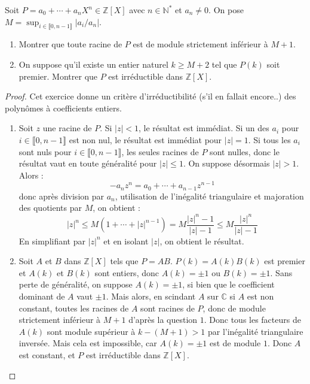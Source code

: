 \documentclass[french,a4paper]{article}
\newcommand{\N}{\mathbb{N}}
\newcommand{\Z}{\mathbb{Z}}
\newcommand{\C}{\mathbb{C}}
\newcommand{\st}{^*}
\theoremstyle{plain}
\theoremstyle{definition}
\theoremstyle{remark}
\begin{document}
\begin{ex}{}
	Soit $P=a_0+\cdots+a_nX^n\in\Z[X]$ avec $n\in\N\st$ et $a_n\ne 0$. On pose $M=\displaystyle\sup_{i\in\llbracket0,n-1\rrbracket}\lvert a_i/a_{n}\rvert$.
	\begin{enumerate}
		\item Montrer que toute racine de $P$ est de module strictement inférieur à $M+1$.
		\item On suppose qu'il existe un entier naturel $k\geqslant M+2$ tel que $P(k)$ soit premier. Montrer que $P$ est irréductible dans $\Z[X]$.
	\end{enumerate}
\end{ex}
\begin{proof}
	Cet exercice donne un critère d'irréductibilité (s'il en fallait encore..) des polynômes à coefficients entiers.
	\begin{enumerate}
		\item Soit $z$ une racine de $P$. Si $\lvert z\rvert<1$, le résultat est immédiat. Si un des $a_i$ pour $i\in\llbracket0,n-1\rrbracket$ est non nul, le résultat est immédiat pour $\lvert z\rvert=1$. Si tous les $a_i$ sont nuls pour $i\in\llbracket0,n-1\rrbracket$, les seules racines de $P$ sont nulles, donc le résultat vaut en toute généralité pour $\lvert z\rvert\leqslant 1$. On suppose désormais $\lvert z\rvert >1$. Alors : $$-a_nz^n=a_0+\cdots+a_{n-1}z^{n-1}$$ donc après division par $a_n$, utilisation de l'inégalité triangulaire et majoration des quotients par $M$, on obtient : $$\lvert z\rvert^n\leqslant M(1+\cdots+\lvert z\rvert^{n-1})=M\frac{\lvert z\rvert^n-1}{\lvert z\rvert-1}\leqslant M\frac{\lvert z\rvert^n}{\lvert z\rvert-1}$$ En simplifiant par $\lvert z\rvert^n$ et en isolant $\lvert z\rvert$, on obtient le résultat.
		\item Soit $A$ et $B$ dans $\Z[X]$ tels que $P=AB$. $P(k)=A(k)B(k)$ est premier et $A(k)$ et $B(k)$ sont entiers, donc $A(k)=\pm1$ ou $B(k)=\pm1$. Sans perte de généralité, on suppose $A(k)=\pm1$, si bien que le coefficient dominant de $A$ vaut $\pm1$. Mais alors, en scindant $A$ sur $\C$ si $A$ est non constant, toutes les racines de $A$ sont racines de $P$, donc de module strictement inférieur à $M+1$ d'après la question $1$. Donc tous les facteurs de $A(k)$ sont module supérieur à $k-(M+1)>1$ par l'inégalité triangulaire inversée. Mais cela est impossible, car $A(k)=\pm1$ est de module $1$. Donc $A$ est constant, et $P$ est irréductible dans $\Z[X]$.
	\end{enumerate}
\end{proof}
\end{document}
